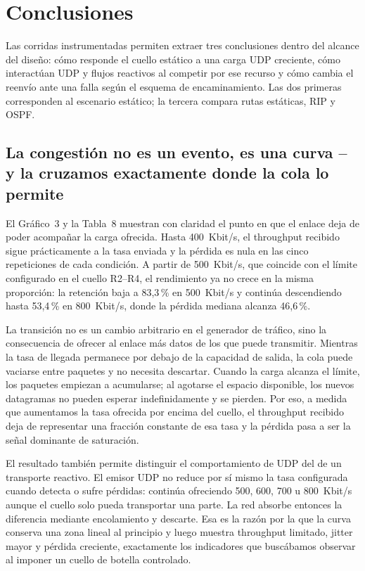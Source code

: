 \documentclass[11pt,a4paper]{article}
\begin{document}
\clearpage
\section*{Conclusiones}
\label{sec:conclusiones}

Las corridas instrumentadas permiten extraer tres conclusiones dentro del alcance del dise\~no: c\'omo responde el cuello est\'atico a una carga UDP creciente, c\'omo interact\'uan UDP y flujos reactivos al competir por ese recurso y c\'omo cambia el reenv\'io ante una falla seg\'un el esquema de encaminamiento. Las dos primeras corresponden al escenario est\'atico; la tercera compara rutas est\'aticas, RIP y OSPF.

\subsection*{La congesti\'on no es un evento, es una curva -- y la cruzamos exactamente donde la cola lo permite}

El Gr\'afico~3 y la Tabla~8 muestran con claridad el punto en que el enlace deja de poder acompa\~nar la carga ofrecida. Hasta 400~Kbit/s, el throughput recibido sigue pr\'acticamente a la tasa enviada y la p\'erdida es nula en las cinco repeticiones de cada condici\'on. A partir de 500~Kbit/s, que coincide con el l\'imite configurado en el cuello R2--R4, el rendimiento ya no crece en la misma proporci\'on: la retenci\'on baja a 83,3\,\% en 500~Kbit/s y contin\'ua descendiendo hasta 53,4\,\% en 800~Kbit/s, donde la p\'erdida mediana alcanza 46,6\,\%.

La transici\'on no es un cambio arbitrario en el generador de tr\'afico, sino la consecuencia de ofrecer al enlace m\'as datos de los que puede transmitir. Mientras la tasa de llegada permanece por debajo de la capacidad de salida, la cola puede vaciarse entre paquetes y no necesita descartar. Cuando la carga alcanza el l\'imite, los paquetes empiezan a acumularse; al agotarse el espacio disponible, los nuevos datagramas no pueden esperar indefinidamente y se pierden. Por eso, a medida que aumentamos la tasa ofrecida por encima del cuello, el throughput recibido deja de representar una fracci\'on constante de esa tasa y la p\'erdida pasa a ser la se\~nal dominante de saturaci\'on.

El resultado tambi\'en permite distinguir el comportamiento de UDP del de un transporte reactivo. El emisor UDP no reduce por s\'i mismo la tasa configurada cuando detecta o sufre p\'erdidas: contin\'ua ofreciendo 500, 600, 700 u 800~Kbit/s aunque el cuello solo pueda transportar una parte. La red absorbe entonces la diferencia mediante encolamiento y descarte. Esa es la raz\'on por la que la curva conserva una zona lineal al principio y luego muestra throughput limitado, jitter mayor y p\'erdida creciente, exactamente los indicadores que busc\'abamos observar al imponer un cuello de botella controlado.
\end{document}
